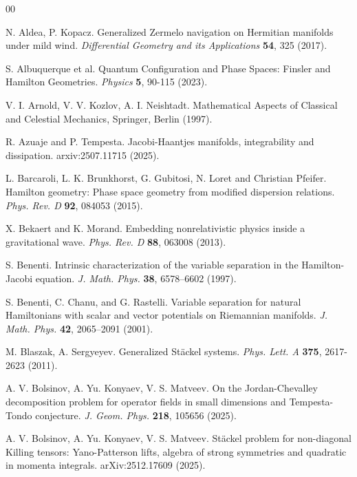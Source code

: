 \documentclass[10pt]{amsart}
\numberwithin{equation}{section}
\newcommand{\tbf}{\textbf}
\theoremstyle{definition}
\begin{document}
	\begin{thebibliography}{00} 
		
		 N. Aldea, P. Kopacz. Generalized Zermelo navigation on Hermitian manifolds under mild wind. \textit{ Differential Geometry and its Applications} \textbf{54}, 325 (2017).
		
		 S. Albuquerque et al. Quantum Configuration and Phase Spaces: Finsler and Hamilton Geometries. \textit{Physics} \textbf{5}, 90-115 (2023).
		
		 V. I. Arnold, V. V. Kozlov, A. I. Neishtadt. Mathematical Aspects of Classical and Celestial Mechanics, Springer, Berlin (1997).
		
		  R. Azuaje and P. Tempesta. Jacobi-Haantjes manifolds, integrability and dissipation. arxiv:2507.11715 (2025).
		
		 L. Barcaroli, L. K. Brunkhorst, G. Gubitosi, N. Loret and Christian Pfeifer. Hamilton geometry: Phase space geometry from modified dispersion relations. \textit{Phys. Rev. D} 
		\tbf{92}, 084053 (2015).
		
		
		 X. Bekaert and K. Morand. Embedding nonrelativistic physics inside a gravitational wave. \textit{Phys. Rev. D} \tbf{88}, 063008 (2013).
		
        S. Benenti. Intrinsic characterization of the variable separation in the Hamilton-Jacobi equation. \textit{J. Math. Phys.} \textbf{38}, 6578--6602 (1997).
        
		 S. Benenti, C. Chanu, and G. Rastelli. Variable separation for natural Hamiltonians with scalar and vector potentials
		on Riemannian manifolds. \textit{J. Math. Phys.} \textbf{42}, 2065--2091 (2001).
		
		 M. Blaszak, A. Sergyeyev. Generalized St\"ackel systems. \textit{Phys. Lett. A} \tbf{375}, 2617-2623 (2011).

		 A. V. Bolsinov, A. Yu. Konyaev, V. S. Matveev. On the Jordan-Chevalley decomposition problem for operator fields in small dimensions and Tempesta-Tondo conjecture. \textit{J. Geom. Phys.} \textbf{218}, 105656 (2025).

		 A. V. Bolsinov, A. Yu. Konyaev, V. S. Matveev. St\"ackel problem for non-diagonal Killing tensors: Yano-Patterson lifts, algebra of strong symmetries and quadratic in momenta integrals. arXiv:2512.17609 (2025).


\end{thebibliography}
\end{document}
